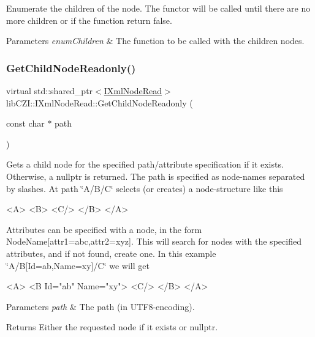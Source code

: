 Enumerate the children of the node. The functor will be called until there are no more children or if the function return false. 
\begin{DoxyParams}{Parameters}
{\em enum\+Children} & The function to be called with the children nodes. \\
\hline
\end{DoxyParams}
\mbox{\label{classlib_c_z_i_1_1_i_xml_node_read_a4e14de646b5624daf11b16ba42094c74}} 
\subsubsection{\texorpdfstring{Get\+Child\+Node\+Readonly()}{GetChildNodeReadonly()}}
{\footnotesize\ttfamily virtual std\+::shared\+\_\+ptr$<$\hyperlink{classlib_c_z_i_1_1_i_xml_node_read}{I\+Xml\+Node\+Read}$>$ lib\+C\+Z\+I\+::\+I\+Xml\+Node\+Read\+::\+Get\+Child\+Node\+Readonly (\begin{DoxyParamCaption}\item[{const char $\ast$}]{path }\end{DoxyParamCaption})\hspace{0.3cm}{\ttfamily [pure virtual]}}

Gets a child node for the specified path/attribute specification if it exists. Otherwise, a nullptr is returned. The path is specified as node-\/names separated by slashes. At path \char`\"{}\+A/\+B/\+C\char`\"{} selects (or creates) a node-\/structure like this 
\begin{DoxyCode}
<A>
  <B>
    <C/>
  </B>
</A>
\end{DoxyCode}
 Attributes can be specified with a node, in the form \textquotesingle{}Node\+Name\mbox{[}attr1=abc,attr2=xyz\mbox{]}\textquotesingle{}. This will search for nodes with the specified attributes, and if not found, create one. In this example \char`\"{}\+A/\+B\mbox{[}\+Id=ab,\+Name=xy\mbox{]}/\+C\char`\"{} we will get 
\begin{DoxyCode}
<A>
  <B Id="ab" Name="xy">
    <C/>
  </B>
</A>
\end{DoxyCode}
 
\begin{DoxyParams}{Parameters}
{\em path} & The path (in U\+T\+F8-\/encoding). \\
\hline
\end{DoxyParams}
\begin{DoxyReturn}{Returns}
Either the requested node if it exists or nullptr. 
\end{DoxyReturn}
\mbox{\label{classlib_c_z_i_1_1_i_xml_node_read_a7a17744c795303a9c446b5ccf850a90c}} 
